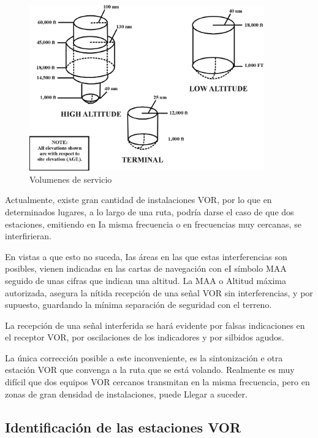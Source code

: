 \begin{figure}[!htb]
  \centering
  \includegraphics[width=0.9\textwidth]{Imagenes/06.02.vor.imagenes/vor-service-volume-02.png}
  \caption{Volumenes de servicio}
  \label{fig:volumenes.de.servicio}
\end{figure}

Actualmente, existe gran cantidad de instalaciones VOR, por lo que en determinados lugares, a lo largo de una ruta, podría darse el caso de que dos estaciones, emitiendo en Ia misma frecuencia o en frecuencias muy cercanas, se interfirieran. 

En vistas a que esto no suceda, Ias áreas en las que estas interferencias son posibles, vienen indicadas en las cartas de navegación con eI símbolo MAA seguido de unas cifras que indican una altitud. La MAA o Altitud máxima autorizada, asegura la nítida recepción de una señal VOR  sin interferencias, y por supuesto, guardando la mínima separación de seguridad con el terreno.

La recepción de una señal interferida se hará evidente por falsas indicaciones en el receptor VOR, por oscilaciones de los indicadores y por silbidos agudos.

La única corrección posible a este inconveniente, es la sintonización e otra estación VOR que convenga a la ruta que se está volando. Realmente es muy difícil que dos equipos VOR cercanos transmitan en la misma frecuencia, pero en zonas de gran densidad de instalaciones, puede Llegar a suceder.

\subsection{Identificación de las estaciones VOR}


